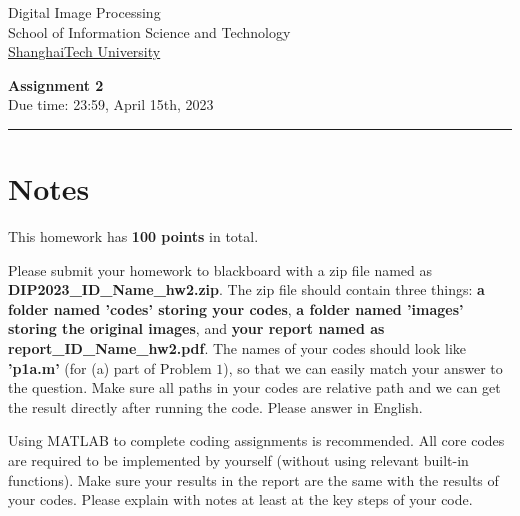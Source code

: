 \documentclass[11pt,letterpaper]{article}
\begin{document}

\usetikzlibrary{positioning}
\pagestyle{plain}
\begin{flushleft}
Digital Image Processing\\
School of Information Science and Technology\\
\underline{ShanghaiTech University}
\end{flushleft}

 
\begin{center}\vspace{-1cm}
\textbf{\large Assignment 2}\\  
Due time: 23:59,	April 15th,	2023\\
\end{center}
\rule{\linewidth}{0.1mm}

\section{Notes}
This homework has \textbf{100 points} in total. \par
Please submit your homework to blackboard with a zip file named as \textcolor[rgb]{1,0,0}{\textbf{DIP2023\_ID\_Name\_hw2.zip}}. The zip file should contain three things: \textcolor[rgb]{1,0,0}{\textbf{a folder named 'codes' storing your codes}},  \textcolor[rgb]{1,0,0}{\textbf{a folder named 'images' storing the original images}}, and \textcolor[rgb]{1,0,0}{\textbf{your report named as report\_ID\_Name\_hw2.pdf}}. The names of your codes should look like \textcolor[rgb]{1,0,0}{\textbf{'p1a.m'}} (for (a) part of Problem $1$), so that we can easily match your answer to the question. \textcolor[rgb]{1,0,0}{Make sure all paths in your codes are relative path and we can get the result directly after running the code}. Please answer in \textcolor[rgb]{1,0,0}{English}. \par

Using MATLAB to complete coding assignments is recommended. All core codes are required to be implemented \textcolor[rgb]{1,0,0}{by yourself} (without using relevant built-in functions). Make sure your results in the report are the same with the results of your codes. Please explain with notes at least at the key steps of your code.
\end{document}
